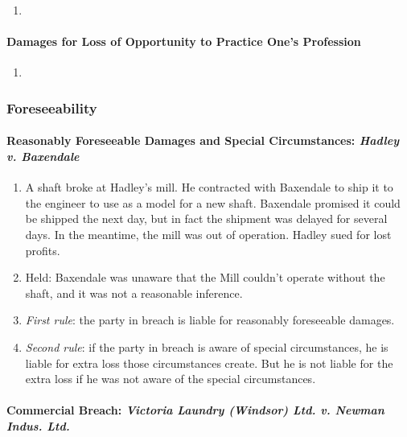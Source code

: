\begin{enumerate}
    \item %
\end{enumerate}

\paragraph{Damages for Loss of Opportunity to Practice One's Profession}

\begin{enumerate}
    \item %
\end{enumerate}

\newpage

\subsubsection{Foreseeability}

\paragraph{Reasonably Foreseeable Damages and Special Circumstances: 
\emph{Hadley v. Baxendale}}

\begin{enumerate}
    \item A shaft broke at Hadley's mill. He contracted with Baxendale to ship 
    it to the engineer to use as a model for a new shaft. Baxendale promised 
    it could be shipped the next day, but in fact the shipment was delayed for 
    several days. In the meantime, the mill was out of operation. Hadley sued 
    for lost profits.
    \item Held: Baxendale was unaware that the Mill couldn't operate without 
    the shaft, and it was not a reasonable inference.
    \item \emph{First rule}: the party in breach is liable for reasonably 
    foreseeable damages.
    \item \emph{Second rule}: if the party in breach is aware of special 
    circumstances, he is liable for extra loss those circumstances create. But 
    he is not liable for the extra loss if he was not aware of the special 
    circumstances.
\end{enumerate}

\paragraph{Commercial Breach: \emph{Victoria Laundry (Windsor) Ltd. v. Newman 
Indus. Ltd.}}

